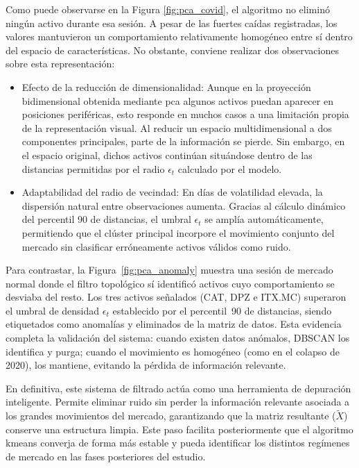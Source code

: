 \documentclass[
]{article}
\begin{document}
Como puede observarse en la Figura \ref{fig:pca_covid}, el algoritmo no eliminó ningún activo durante esa sesión. A pesar de las fuertes caídas registradas, los valores mantuvieron un comportamiento relativamente homogéneo entre sí dentro del espacio de características. No obstante, conviene realizar dos observaciones sobre esta representación:

\begin{itemize}
    \item Efecto de la reducción de dimensionalidad: Aunque en la proyección bidimensional obtenida mediante \gls{pca} algunos activos puedan aparecer en posiciones periféricas, esto responde en muchos casos a una limitación propia de la representación visual. Al reducir un espacio multidimensional a dos componentes principales, parte de la información se pierde. Sin embargo, en el espacio original, dichos activos continúan situándose dentro de las distancias permitidas por el radio $\epsilon_t$ calculado por el modelo.

    \item Adaptabilidad del radio de vecindad: En días de volatilidad elevada, la dispersión natural entre observaciones aumenta. Gracias al cálculo dinámico del percentil 90 de distancias, el umbral $\epsilon_t$ se amplía automáticamente, permitiendo que el clúster principal incorpore el movimiento conjunto del mercado sin clasificar erróneamente activos válidos como ruido.
\end{itemize}

Para contrastar, la Figura~\ref{fig:pca_anomaly} muestra una sesión de mercado normal donde el filtro topológico sí identificó activos cuyo comportamiento se desviaba del resto. Los tres activos señalados (CAT, DPZ e ITX.MC) superaron el umbral de densidad $\epsilon_t$ establecido por el percentil~90 de distancias, siendo etiquetados como anomalías y eliminados de la matriz de datos. Esta evidencia completa la validación del sistema: cuando existen datos anómalos, DBSCAN los identifica y purga; cuando el movimiento es homogéneo (como en el colapso de 2020), los mantiene, evitando la pérdida de información relevante.

En definitiva, este sistema de filtrado actúa como una herramienta de depuración inteligente. Permite eliminar ruido sin perder la información relevante asociada a los grandes movimientos del mercado, garantizando que la matriz resultante ($\tilde{X}$) conserve una estructura limpia. Este paso facilita posteriormente que el algoritmo \gls{kmeans} converja de forma más estable y pueda identificar los distintos regímenes de mercado en las fases posteriores del estudio.
\end{document}
